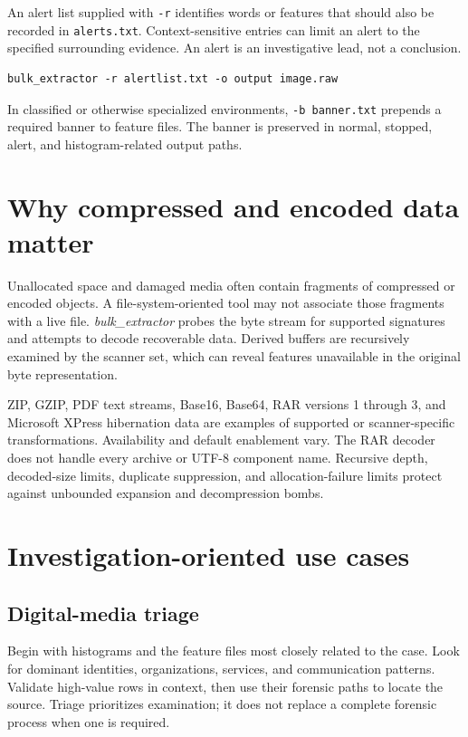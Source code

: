 \documentclass[11pt]{article}
\newcommand{\bulk}{\textit{bulk\_extractor}\xspace}
\newcommand{\code}[1]{\texttt{#1}}
\begin{document}
An alert list supplied with \code{-r} identifies words or features that should
also be recorded in \code{alerts.txt}. Context-sensitive entries can limit an
alert to the specified surrounding evidence. An alert is an investigative
lead, not a conclusion.

\begin{Verbatim}
bulk_extractor -r alertlist.txt -o output image.raw
\end{Verbatim}

In classified or otherwise specialized environments, \code{-b banner.txt}
prepends a required banner to feature files. The banner is preserved in normal,
stopped, alert, and histogram-related output paths.

\section{Why compressed and encoded data matter}

Unallocated space and damaged media often contain fragments of compressed or
encoded objects. A file-system-oriented tool may not associate those fragments
with a live file. \bulk probes the byte stream for supported signatures and
attempts to decode recoverable data. Derived buffers are recursively examined
by the scanner set, which can reveal features unavailable in the original byte
representation.

ZIP, GZIP, PDF text streams, Base16, Base64, RAR versions 1 through 3, and
Microsoft XPress hibernation data are examples of supported or scanner-specific
transformations. Availability and default enablement vary. The RAR decoder does
not handle every archive or UTF-8 component name. Recursive depth, decoded-size
limits, duplicate suppression, and allocation-failure limits protect against
unbounded expansion and decompression bombs.

\section{Investigation-oriented use cases}

\subsection{Digital-media triage}

Begin with histograms and the feature files most closely related to the case.
Look for dominant identities, organizations, services, and communication
patterns. Validate high-value rows in context, then use their forensic paths to
locate the source. Triage prioritizes examination; it does not replace a
complete forensic process when one is required.
\end{document}

